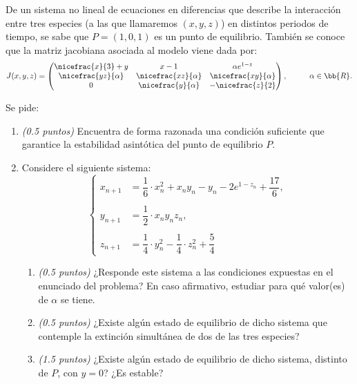 \documentclass[12pt]{article}
\begin{document}
    \begin{ejercicio}
        De un sistema no lineal de ecuaciones en diferencias que describe la interacción entre tres especies
        (a las que llamaremos $(x,y,z)$) en distintos periodos de tiempo,
        se sabe que $P=(1,0,1)$ es un punto de equilibrio. También se conoce que la matriz jacobiana asociada al modelo viene dada por:
        \begin{equation*}
            J(x,y,z) = \begin{pmatrix}
                \nicefrac{x}{3} + y & x-1 & \alpha e^{1-z} \\
                \nicefrac{yz}{\alpha} & \nicefrac{xz}{\alpha} & \nicefrac{xy}{\alpha} \\
                0 & \nicefrac{y}{\alpha} & -\nicefrac{z}{2}
            \end{pmatrix},\hspace{1cm} \alpha\in \bb{R}.
        \end{equation*}

        Se pide:
        \begin{enumerate}
            \item \emph{(0.5 puntos)} Encuentra de forma razonada una condición suficiente que garantice la
            estabilidad asintótica del punto de equilibrio $P$.

            \item Considere el siguiente sistema:
            \begin{equation*}
                \left\{
                \begin{aligned}
                    x_{n+1} &= \dfrac{1}{6}\cdot x_n^2 + x_ny_n - y_n - 2e^{1-z_n} + \dfrac{17}{6},\\ \\
                    y_{n+1} &= \dfrac{1}{2}\cdot x_ny_nz_n,\\ \\
                    z_{n+1} &= \dfrac{1}{4}\cdot y_n^2 - \dfrac{1}{4}\cdot z_n^2 + \dfrac{5}{4}
                \end{aligned}
                \right.
            \end{equation*}

            \begin{enumerate}
                \item \emph{(0.5 puntos)} ¿Responde este sistema a las condiciones expuestas en el enunciado del problema? En caso afirmativo, estudiar para qué valor(es) de $\alpha$ se tiene.
                \item \emph{(0.5 puntos)} ¿Existe algún estado de equilibrio de dicho sistema que contemple la extinción simultánea de dos de las tres especies?
                \item \emph{(1.5 puntos)} ¿Existe algún estado de equilibrio de dicho sistema, distinto de $P$, con $y=0$? ¿Es estable?
            \end{enumerate}


\end{enumerate}
\end{ejercicio}
\end{document}
